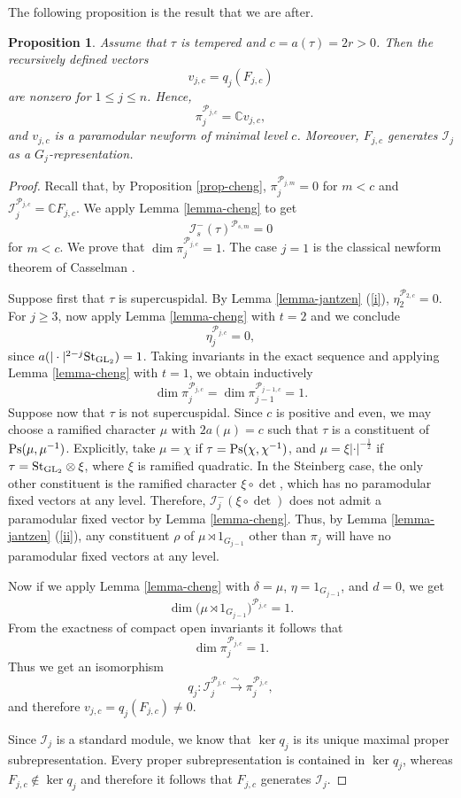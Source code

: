 \documentclass[12pt]{amsart}
\newtheorem{proposition}[theorem]{Proposition}
\theoremstyle{definition}
\theoremstyle{remark}
\begin{document}
The following proposition is the result that we are after.
\begin{proposition}\label{prop-rsj}
Assume that $\tau$ is tempered and $c=a(\tau)=2r>0$. Then the recursively defined vectors
\[
v_{j,c}=q_j(F_{j,c})
\]
are nonzero for $1\leq j\leq n$. Hence,
\[
\pi_j^{\mathcal P_{j,c}}=\mathbb C v_{j,c},
\]
and $v_{j,c}$ is a paramodular newform of minimal level $c$. Moreover, $F_{j,c}$ generates $\mathcal I_j$ as a $G_j$-representation.
\end{proposition}

\begin{proof}
Recall that, by Proposition \ref{prop-cheng},
$\pi_j^{\mathcal P_{j,m}}=0$ for $m < c$ and $
\mathcal I_j^{\mathcal P_{j,c}}=\mathbb C F_{j,c}$. We apply Lemma \ref{lemma-cheng} to get 
\[
\mathcal I_s^-(\tau)^{\mathcal P_{s,m}}=0\]
for $m<c$.
We prove that $\dim\pi_j^{\mathcal P_{j,c}}=1$. The case $j=1$ is the classical newform theorem of Casselman \cite{cas73}.

Suppose first that $\tau$ is supercuspidal. By Lemma \ref{lemma-jantzen} (\ref{i}), $\eta_2^{\mathcal P_{2,c}}=0$. For $j\geq3$, now apply Lemma \ref{lemma-cheng} with $t=2$ and we conclude
\[
\eta_j^{\mathcal P_{j,c}}=0,
\]
since $a(|\cdot|^{2-j}{\rm St}_{{\rm GL}_2})=1$. Taking invariants in the exact sequence and applying Lemma \ref{lemma-cheng} with $t=1$, we obtain inductively
\[
\dim\pi_j^{\mathcal P_{j,c}}
=
\dim\pi_{j-1}^{\mathcal P_{j-1,c}}
=1.
\]
Suppose now that $\tau$ is not supercuspidal. Since $c$ is positive and even, we may choose a ramified character $\mu$ with $2a(\mu)=c$ such that $\tau$ is a constituent of ${\rm Ps}(\mu,\mu^{-1})$. Explicitly, take $\mu=\chi$ if $\tau={\rm Ps}(\chi,\chi^{-1})$, and $\mu=\xi|\cdot|^{-\frac{1}{2}}$ if $\tau={\rm St}_{{\rm GL}_2} \otimes \xi$, where $\xi$ is ramified quadratic. 
In the Steinberg case, the only other constituent is the ramified character  $\xi\circ\det$, which has no paramodular fixed vectors at any level. Therefore, $\mathcal I_j^-(\xi\circ\det)$ does not admit a paramodular fixed vector by Lemma \ref{lemma-cheng}. Thus, by Lemma \ref{lemma-jantzen} (\ref{ii}), any constituent $\rho$ of $\mu\rtimes 1_{G_{j-1}}$ other than $\pi_j$ will have no paramodular fixed vectors at any level.

Now if we apply Lemma \ref{lemma-cheng} with $\delta=\mu$, $\eta=1_{G_{j-1}}$, and $d=0$, we get 
\[
\dim
\bigl(\mu\rtimes 1_{G_{j-1}}\bigr)^{\mathcal P_{j,c}}
=1.
\]
From the exactness of compact open invariants it follows that 
\[
\dim\pi_j^{\mathcal P_{j,c}}=1.
\]
Thus we get an isomorphism
\[
q_j:\mathcal I_j^{\mathcal P_{j,c}}
\xrightarrow{\ \sim\ }
\pi_j^{\mathcal P_{j,c}},
\]
and therefore $v_{j,c}=q_j(F_{j,c})\neq0$.

Since $\mathcal I_j$ is a standard module, we know that $\ker q_j$ is its unique maximal proper subrepresentation. Every proper subrepresentation is contained in $\ker q_j$, whereas $F_{j,c}\notin\ker q_j$ and therefore it follows that $F_{j,c}$ generates $\mathcal I_j$.
\end{proof}
\end{document}
